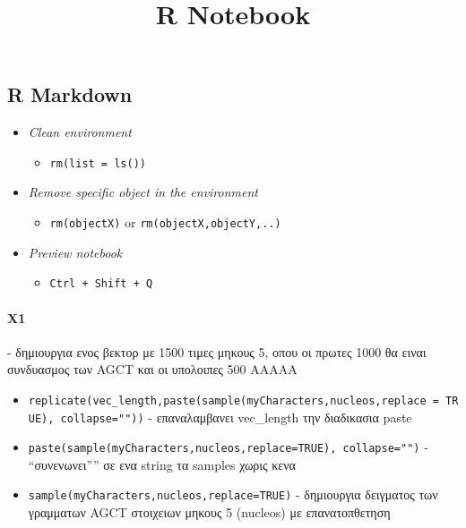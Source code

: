 \documentclass[
]{article}
\title{R Notebook}
\author{}
\date{\vspace{-2.5em}}
\providecommand{\tightlist}{%
  \setlength{\itemsep}{0pt}\setlength{\parskip}{0pt}}
\begin{document}
\maketitle

\subsection{R Markdown}\label{r-markdown}

\begin{itemize}
\item
  \emph{Clean environment}

  \begin{itemize}
  \tightlist
  \item
    \texttt{rm(list\ =\ ls())}
  \end{itemize}
\item
  \emph{Remove specific object in the environment}

  \begin{itemize}
  \tightlist
  \item
    \texttt{rm(objectX)} or \texttt{rm(objectX,objectY,..)}
  \end{itemize}
\item
  \emph{Preview notebook}

  \begin{itemize}
  \tightlist
  \item
    \texttt{Ctrl\ +\ Shift\ +\ Q}
  \end{itemize}
\end{itemize}

\paragraph{X1}\label{x1}

- δημιουργια ενος βεκτορ με 1500 τιμες μηκους 5, οπου οι πρωτες 1000 θα
ειναι συνδυασμος των AGCT και οι υπολοιπες 500 ΑΑΑΑΑ

\begin{itemize}
\item
  \texttt{replicate(vec\_length,paste(sample(myCharacters,nucleos,replace\ =\ TRUE),\ collapse=""))}
  - επαναλαμβανει vec\_length την διαδικασια paste
\item
  \texttt{paste(sample(myCharacters,nucleos,replace=TRUE),\ collapse="")}
  - ``συνενωνει'''' σε ενα string τα samples χωρις κενα
\item
  \texttt{sample(myCharacters,nucleos,replace=TRUE)} - δημιουργια
  δειγματος των γραμματων AGCT στοιχειων μηκους 5 (nucleos) με
  επανατοπθετηση
\end{itemize}
\end{document}
